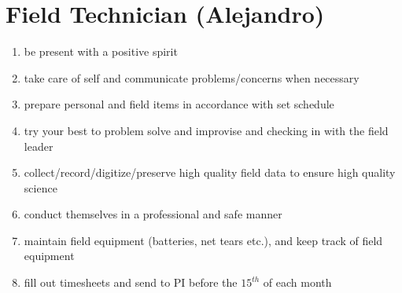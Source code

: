\documentclass[12pt]{article}
\begin{document}
\section{Field Technician (Alejandro)}
\begin{enumerate}
\item be present with a positive spirit
\item take care of self and communicate problems/concerns when
  necessary
\item prepare personal and field items in accordance with set schedule
\item try your best to problem solve and improvise and checking in
  with the field leader
\item collect/record/digitize/preserve high quality field data to
  ensure high quality science
\item conduct themselves in a professional and safe manner
\item maintain field equipment (batteries, net tears etc.), and keep
  track of field equipment
\item fill out timesheets and send to PI before the $15^{th}$ of each month
\end{enumerate}
\end{document}
